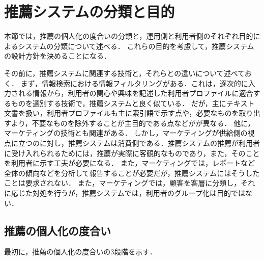 \chapter{推薦システムの分類と目的}
\label{sec:rsysgoal}

本節では，推薦の個人化の度合いの分類と，運用側と利用者側のそれぞれ目的によるシステムの分類について述べる．
これらの目的を考慮して，推薦システムの設計方針を決めることになる．

その前に，推薦システムに関連する技術と，それらとの違いについて述べておく．
まず，情報検索における情報フィルタリングがある．これは，逐次的に入力される情報から，利用者の関心や興味を記述した利用者プロファイルに適合するものを選別する技術\cite{jb:012:00}で，推薦システムと良く似ている．
だが，主にテキスト文書を扱い，利用者プロファイルも主に索引語で示す点や，必要なものを取り出すより，不要なものを除外することが主目的である点などがが異なる．
他に，マーケティングの技術とも関連がある．
しかし，マーケティングが供給側の視点に立つのに対し，推薦システムは消費側である．推薦システムの推薦が利用者に受け入れられるためには，推薦が実際に客観的なものであり，また，そのことを利用者に示す工夫が必要になる．
また，マーケティングでは，レポートなど全体の傾向などを分析して報告することが必要だが，推薦システムにはそうしたことは要求されない．
また，マーケティングでは，顧客を客層に分類し，それに応じた対処を行うが，推薦システムでは，利用者のグループ化は目的ではない．

\section{推薦の個人化の度合い}
\label{sec:plevel}

最初に，推薦の個人化の度合いの3段階\cite{dmkd:01:01}を示す．

